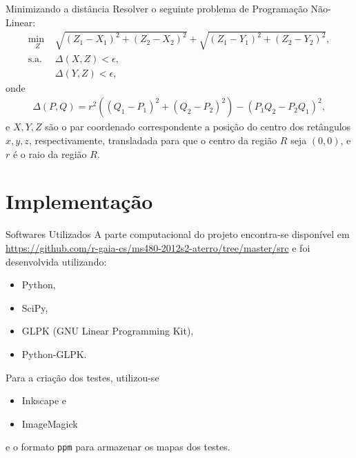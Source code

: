 \documentclass[11pt]{beamer}
\begin{document}
\begin{frame}{Minimizando a distância}
    Resolver o seguinte problema de Programação Não-Linear:
    \begin{align*}
        \underset{Z}{\text{min }} & \sqrt{(Z_1 - X_1)^2 + (Z_2 - X_2)^2} +
        \sqrt{(Z_1 - Y_1)^2 + (Z_2 - Y_2)^2}, \\
        \text{s.a. } & \Delta(X, Z) < \epsilon, \\
        & \Delta(Y, Z) < \epsilon,
    \end{align*}
    onde
    \begin{align*}
        \Delta(P, Q) = r^2 \left( (Q_1 - P_1)^2 + (Q_2 - P_2)^2 \right) - \left(
        P_1 Q_2 - P_2 Q_1 \right)^2,
    \end{align*}
    e $X, Y, Z$ são o par coordenado correspondente a posição do centro dos
    retângulos $x, y, z$, respectivamente, transladada para que o centro da região
    $R$ seja $(0, 0)$, e $r$ é o raio da região $R$.
\end{frame}

\section{Implementação}
\begin{frame}{Softwares Utilizados}
A parte computacional do projeto encontra-se disponível em
\url{https://github.com/r-gaia-cs/ms480-2012s2-aterro/tree/master/src} e foi
desenvolvida utilizando:
\begin{itemize}
    \item Python\nocite{Python},
    \item SciPy\nocite{SciPy},
    \item GLPK (GNU Linear Programming Kit)\nocite{GLPK},
    \item Python-GLPK.
\end{itemize}
Para a criação dos testes, utilizou-se
\begin{itemize}
    \item Inkscape e
    \item ImageMagick
\end{itemize}
e o formato \texttt{ppm} para armazenar os mapas dos testes.
\end{frame}
\end{document}

